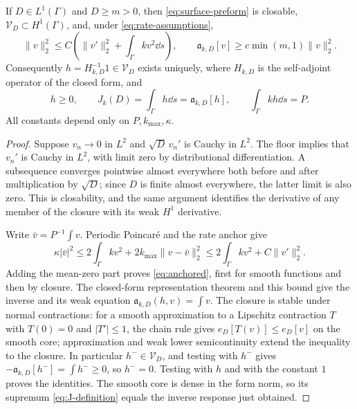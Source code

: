 \begin{lemma}\label{lem:positive-form}
If $D\in L^1(\Gamma)$ and $D\ge m>0$, then \eqref{eq:surface-preform}
is closable, $\mathcal V_D\subset H^1(\Gamma)$, and, under
\eqref{eq:rate-assumptions},
\begin{equation}\label{eq:anchored}
 \|v\|_2^2\le C\left(\|v'\|_2^2+\int_\Gamma kv^2\dd s\right),
 \qquad
 \mathfrak a_{k,D}[v]\ge c\min(m,1)\|v\|_2^2.
\end{equation}
Consequently $h=H_{k,D}^{-1}1\in\mathcal V_D$ exists uniquely, where
$H_{k,D}$ is the self-adjoint operator of the closed form, and
\begin{equation}\label{eq:h-identities}
 h\ge0,\qquad J_k(D)=\int_\Gamma h\dd s
       =\mathfrak a_{k,D}[h],\qquad \int_\Gamma kh\dd s=P.
\end{equation}
All constants depend only on $P,k_{\max},\kappa$.
\end{lemma}
\begin{proof}
Suppose $v_n\to0$ in $L^2$ and $\sqrt D\,v_n'$ is Cauchy in $L^2$.
The floor implies that $v_n'$ is Cauchy in $L^2$, with limit zero by
distributional differentiation. A subsequence converges pointwise almost
everywhere both before and after multiplication by $\sqrt D$; since
$D$ is finite almost everywhere, the latter limit is also zero. This is
closability, and the same argument identifies the derivative of any
member of the closure with its weak $H^1$ derivative.

Write $\bar v=P^{-1}\int v$. Periodic Poincar\'e and the rate anchor give
\[
 \kappa|\bar v|^2
 \le 2\int_\Gamma kv^2+2k_{\max}\|v-\bar v\|_2^2
 \le2\int_\Gamma kv^2+C\|v'\|_2^2.
\]
Adding the mean-zero part proves \eqref{eq:anchored}, first for smooth
functions and then by closure. The closed-form representation theorem
and this bound give the inverse and its weak equation
$\mathfrak a_{k,D}(h,v)=\int v$.
The closure is stable under normal contractions: for a smooth
approximation to a Lipschitz contraction $T$ with $T(0)=0$ and
$|T'|\le1$, the chain rule gives $e_D[T(v)]\le e_D[v]$ on the smooth
core; approximation and weak lower semicontinuity extend the inequality
to the closure. In particular $h^-\in\mathcal V_D$, and testing with
$h^-$ gives $-\mathfrak a_{k,D}[h^-]=\int h^-\ge0$, so $h^-=0$.
Testing with $h$ and with the constant $1$ proves the identities.
The smooth core is dense in the form norm, so its supremum
\eqref{eq:J-definition} equals the inverse response just obtained.
\end{proof}

